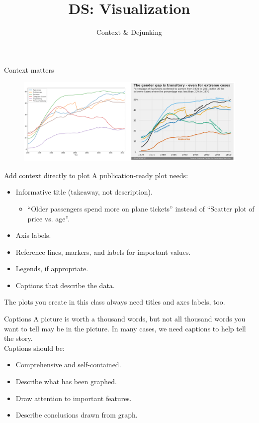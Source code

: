 \documentclass[aspectratio=169]{../latex_main/tntbeamer}  %
\title[Visualization]{DS: Visualization}
\subtitle{Context \& Dejunking}
\begin{document}
	
	\maketitle
	\begin{frame}{Context matters}
	    \begin{figure}
	        \centering
	        \includegraphics[scale=.35]{Bild81}
	    \end{figure}
	\end{frame}
	
	
	\begin{frame}{Add context directly to plot}
	    A publication-ready plot needs:
	    \begin{itemize}
	        \item Informative title (takeaway, not description).
	        \begin{itemize}
	            \item “Older passengers spend more on plane tickets” instead of “Scatter plot of price vs. age”.
	        \end{itemize}
	        \item Axis labels.
	        \item Reference lines, markers, and labels for important values.
	        \item Legends, if appropriate.
	        \item Captions that describe the data.
	    \end{itemize}
	    The plots you create in this class always need titles and axes labels, too.
	\end{frame}
	
	
	\begin{frame}{Captions}
	    A picture is worth a thousand words, but not all thousand words you want to tell may be in the picture. In many cases, we need captions to help tell the story.\\
	    \bigskip
	    Captions should be:
	    \begin{itemize}
	        \item Comprehensive and self-contained.
	        \item Describe what has been graphed.
	        \item Draw attention to important features.
	        \item Describe conclusions drawn from graph.
	    \end{itemize}
	\end{frame}
	
\end{document}
